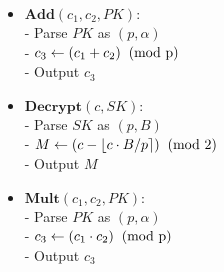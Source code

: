 \documentclass{beamer}
\begin{document}
\begin{frame}
\begin{scriptsize}
\begin{minipage}{.45\textwidth}
\begin{itemize}
\item $\mathbf{Add}(c_1,c_2, PK):$
\\- Parse $PK$ as $(p,\alpha)$
\\- $c_3\leftarrow (c_1+c_2) \hspace{2mm} \text{(mod p)}$
\\- Output $c_3$
\end{itemize}
\end{minipage}
\begin{minipage}{.45\textwidth}
\begin{itemize}
\item $\mathbf{Decrypt}(c, SK):$
\\- Parse $SK$ as $(p,B)$
\\- $M\leftarrow (c - \lfloor c\cdot B/p\rceil) \hspace{2mm} \text{(mod 2)}$
\\- Output $M$
\\\vspace{9 mm}
\item $\mathbf{Mult}(c_1,c_2, PK):$
\\- Parse $PK$ as $(p,\alpha)$
\\- $c_3\leftarrow (c_1\cdot c_2) \hspace{2mm} \text{(mod p)}$
\\- Output $c_3$

\end{itemize}
\end{minipage}
\end{scriptsize}
\end{frame}
\end{document}
